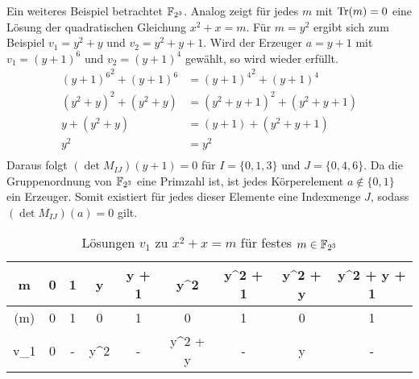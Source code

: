 Ein weiteres Beispiel betrachtet $\field{2}[3]$. Analog zeigt  für jedes $m$ mit $\mathrm{Tr}(m) = 0$ eine Lösung der quadratischen Gleichung $x^2+x=m$. Für $m=y^2$ ergibt sich zum Beispiel $v_1 = y^2 + y$ und $v_2 = y^2 + y + 1$. Wird der Erzeuger $a = y+1$ mit $v_1 = (y+1)^6$ und $v_2 = (y+1)^4$ gewählt, so wird wieder  erfüllt.
\begin{align*}
    {(y+1)^6}^2 + (y+1)^6 &= {(y+1)^4}^2 + (y+1)^4 \\
    (y^2 + y)^2 + (y^2 + y) &= (y^2 + y + 1)^2 + (y^2 + y + 1) \\
    y + (y^2 + y) &= (y+1) + (y^2 + y + 1) \\
    y^2 &= y^2 \\
\end{align*}
Daraus folgt $(\det M_{IJ})(y+1) = 0$ für $I = \{0,1,3\}$ und $J = \{0,4,6\}$.
Da die Gruppenordnung von $\field{2}[3]$ eine Primzahl ist, ist jedes Körperelement $a \notin \{0,1\}$ ein Erzeuger. Somit existiert für jedes dieser Elemente eine Indexmenge $J$, sodass $(\det M_{IJ})(a) = 0$ gilt.

{\renewcommand{\arraystretch}{1.5}
\begin{table}
    \centering
    \begin{tabular}{|C|C|C|C|C|C|C|C|C|}
    \hline
    m               & 0 & 1 & y & y + 1 & y^2 & y^2 + 1 & y^2 + y  & y^2 + y + 1 \\
    \hline
    (m)  & 0 & 1 & 0 & 1     & 0   & 1       & 0        & 1 \\
    \hline
    v_1         & 0 & - & y^2 & - & y^2 + y & - & y & - \\
    \hline
    \end{tabular}
    \caption{Lösungen $v_1$ zu $x^2 + x = m$ für festes $m \in \field{2}[3]$} \label{table:sol_013F2_3}
\end{table}
}

